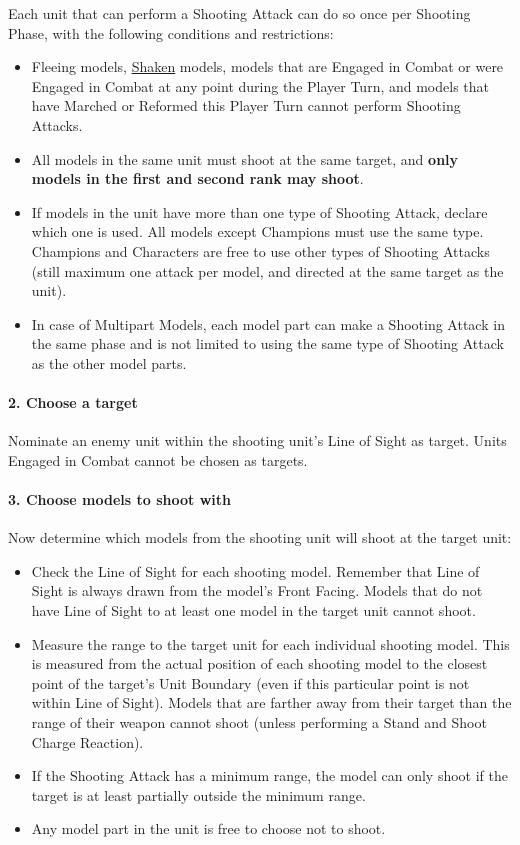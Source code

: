 Each unit that can perform a Shooting Attack can do so once per Shooting Phase, with the following conditions and restrictions:
\begin{itemize}
	\item {}Fleeing models, \hyperref[shaken]{Shaken} models, models that are Engaged in Combat or were Engaged in Combat at any point during the Player Turn, and models that have Marched or Reformed this Player Turn cannot perform Shooting Attacks.
	\item All models in the same unit must shoot at the same target, and \textbf{only models in the first and second rank may shoot}.
	\item If models in the unit have more than one type of Shooting Attack, declare which one is used. All \rnf{} models except Champions must use the same type. Champions and Characters are free to use other types of Shooting Attacks (still maximum one attack per model, and directed at the same target as the unit).
	\item In case of Multipart Models, each model part can make a Shooting Attack in the same phase and is not limited to using the same type of Shooting Attack as the other model parts.
\end{itemize}

\paragraph{2. Choose a target}

Nominate an enemy unit within the shooting unit's Line of Sight as target. Units Engaged in Combat cannot be chosen as targets.

\columnbreak

\paragraph{3. Choose models to shoot with}

Now determine which models from the shooting unit will shoot at the target unit:
\begin{itemize}
	\item Check the Line of Sight for each shooting model. Remember that Line of Sight is always drawn from the model's Front Facing. Models that do not have Line of Sight to at least one model in the target unit cannot shoot.
	\item Measure the range to the target unit for each individual shooting model. This is measured from the actual position of each shooting model to the closest point of the target's Unit Boundary (even if this particular point is not within Line of Sight). Models that are farther away from their target than the range of their weapon cannot shoot (unless performing a Stand and Shoot Charge Reaction).
	\item If the Shooting Attack has a minimum range, the model can only shoot if the target is at least partially outside the minimum range.
	\item Any model part in the unit is free to choose not to shoot.
\end{itemize}

